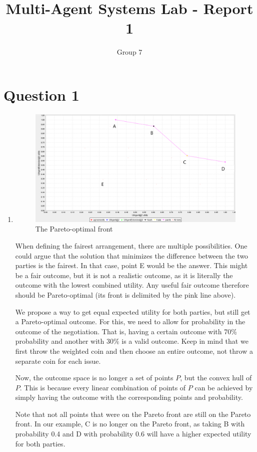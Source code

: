\documentclass{article}
\title{Multi-Agent Systems Lab - Report 1}
\author{Group 7}
\begin{document}
\maketitle

\section{Question 1}
\begin{enumerate}[label=(\alph*)]
\item 
\begin{figure}[h]
\caption{The Pareto-optimal front}
\centering
\includegraphics[width=.75\textwidth]{imgs/graph_2}
\end{figure}

When defining the fairest arrangement, there are multiple possibilities. One could argue that the solution that minimizes the difference between the two parties is the fairest. In that case, point E would be the answer. This might be a fair outcome, but it is not a realistic outcome, as it is literally the outcome with the lowest combined utility. Any useful fair outcome therefore should be Pareto-optimal (its front is delimited by the pink line above).

We propose a way to get equal expected utility for both parties, but still get a Pareto-optimal outcome. For this, we need to allow for probability in the outcome of the negotiation. That is, having a certain outcome with 70\% probability and another with 30\% is a valid outcome. Keep in mind that we first throw the weighted coin and then choose an entire outcome, not throw a separate coin for each issue.

Now, the outcome space is no longer a set of points $P$, but the convex hull of $P$. This is because every linear combination of points of $P$ can be achieved by simply having the outcome with the corresponding points and probability.

Note that not all points that were on the Pareto front are still on the Pareto front. In our example, C is no longer on the Pareto front, as taking B with probability 0.4 and D with probability 0.6 will have a higher expected utility for both parties.


\end{enumerate}
\end{document}
